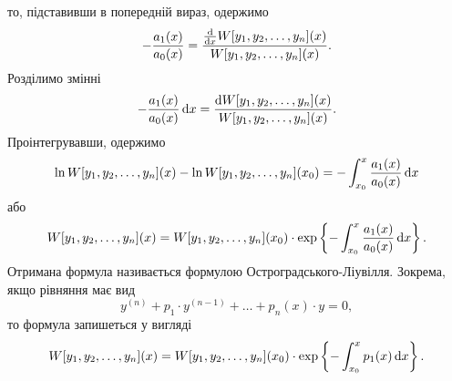 то, підставивши в попередній вираз, одержимо
\begin{equation*}
	- \frac{a_1(x)}{a_0(x)} = \frac{\frac{\mathop{}\!\mathrm{d}}{\mathop{}\!\mathrm{d} x} W[y_1, y_2, \ldots, y_n](x)}{W[y_1, y_2, \ldots, y_n](x)}.
\end{equation*}
Розділимо змінні
\begin{equation*}
	- \frac{a_1(x)}{a_0(x)} \mathop{}\!\mathrm{d} x = \frac{\mathop{}\!\mathrm{d} W[y_1, y_2, \ldots, y_n](x)}{W[y_1, y_2, \ldots, y_n](x)}.
\end{equation*}
Проінтегрувавши, одержимо
\begin{equation*}
	\ln W[y_1, y_2, \ldots, y_n](x) - \ln W[y_1, y_2, \ldots, y_n](x_0) = -\int_{x_0}^x \frac{a_1(x)}{a_0(x)} \mathop{}\!\mathrm{d} x
\end{equation*}
або
\begin{equation*}
	W[y_1, y_2, \ldots, y_n](x) = W[y_1, y_2, \ldots, y_n](x_0) \cdot \exp \left\{ -\int_{x_0}^x \frac{a_1(x)}{a_0(x)} \mathop{}\!\mathrm{d} x \right\}.
\end{equation*}
Отримана формула називається формулою Остроградського-Ліувілля. Зокрема, якщо рівняння має вид
\begin{equation*}
	y^{(n)} + p_1 \cdot y^{(n - 1)} + \ldots + p_n(x) \cdot y = 0,
\end{equation*}
то формула запишеться у вигляді
\begin{equation*}
	W[y_1, y_2, \ldots, y_n](x) = W[y_1, y_2, \ldots, y_n](x_0) \cdot \exp \left\{ -\int_{x_0}^x p_1(x) \mathop{}\!\mathrm{d} x \right\}.
\end{equation*}
